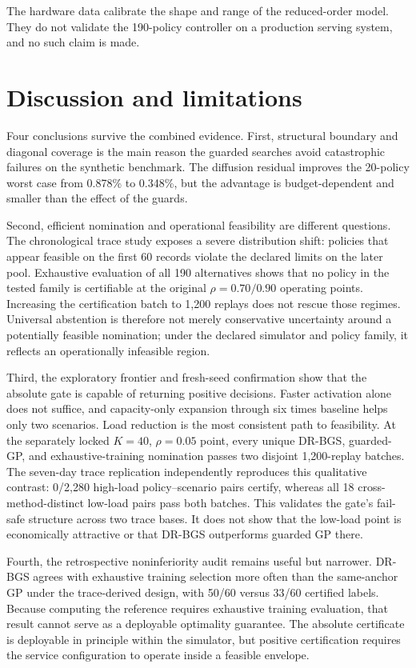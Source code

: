 \documentclass[preprint,12pt]{elsarticle}
\begin{document}
The hardware data calibrate the shape and range of the reduced-order model. They do not validate the 190-policy controller on a production serving system, and no such claim is made.

\section{Discussion and limitations}
\label{sec:discussion}

Four conclusions survive the combined evidence. First, structural boundary and diagonal coverage is the main reason the guarded searches avoid catastrophic failures on the synthetic benchmark. The diffusion residual improves the 20-policy worst case from 0.878\% to 0.348\%, but the advantage is budget-dependent and smaller than the effect of the guards.

Second, efficient nomination and operational feasibility are different questions. The chronological trace study exposes a severe distribution shift: policies that appear feasible on the first 60 records violate the declared limits on the later pool. Exhaustive evaluation of all 190 alternatives shows that no policy in the tested family is certifiable at the original $\rho=0.70/0.90$ operating points. Increasing the certification batch to 1,200 replays does not rescue those regimes. Universal abstention is therefore not merely conservative uncertainty around a potentially feasible nomination; under the declared simulator and policy family, it reflects an operationally infeasible region.

Third, the exploratory frontier and fresh-seed confirmation show that the absolute gate is capable of returning positive decisions. Faster activation alone does not suffice, and capacity-only expansion through six times baseline helps only two scenarios. Load reduction is the most consistent path to feasibility. At the separately locked $K=40$, $\rho=0.05$ point, every unique DR-BGS, guarded-GP, and exhaustive-training nomination passes two disjoint 1,200-replay batches. The seven-day trace replication independently reproduces this qualitative contrast: 0/2,280 high-load policy--scenario pairs certify, whereas all 18 cross-method-distinct low-load pairs pass both batches. This validates the gate's fail-safe structure across two trace bases. It does not show that the low-load point is economically attractive or that DR-BGS outperforms guarded GP there.

Fourth, the retrospective noninferiority audit remains useful but narrower. DR-BGS agrees with exhaustive training selection more often than the same-anchor GP under the trace-derived design, with 50/60 versus 33/60 certified labels. Because computing the reference requires exhaustive training evaluation, that result cannot serve as a deployable optimality guarantee. The absolute certificate is deployable in principle within the simulator, but positive certification requires the service configuration to operate inside a feasible envelope.
\end{document}
